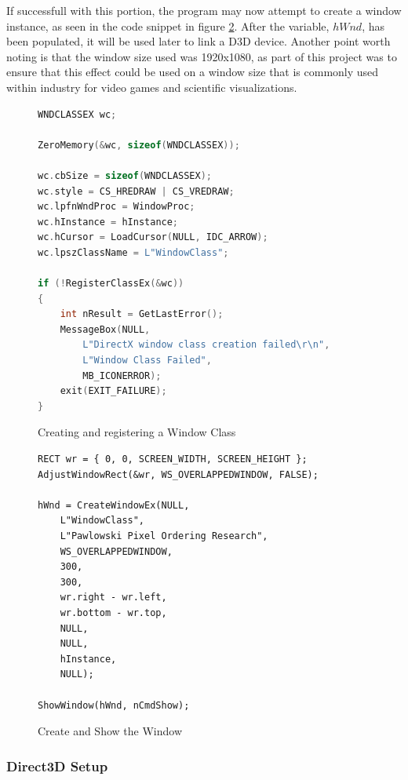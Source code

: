 \documentclass[a4paper, 12pt]{article}
\begin{document}
\noindent If successfull with this portion, the program may now attempt to
create a window instance, as seen in the code snippet in figure
\ref{code:CreateWindow}. After the variable, $hWnd$, has been populated, it
will be used later to link a D3D device. Another point worth noting is that
the window size used was 1920x1080, as part of this project was to ensure that
this effect could be used on a window size that is commonly used within
industry for video games and scientific visualizations.

\begin{figure}[h!]
\begin{lstlisting}[language=C++]
WNDCLASSEX wc;

ZeroMemory(&wc, sizeof(WNDCLASSEX));

wc.cbSize = sizeof(WNDCLASSEX);
wc.style = CS_HREDRAW | CS_VREDRAW;
wc.lpfnWndProc = WindowProc;
wc.hInstance = hInstance;
wc.hCursor = LoadCursor(NULL, IDC_ARROW);
wc.lpszClassName = L"WindowClass";

if (!RegisterClassEx(&wc))
{
	int nResult = GetLastError();
	MessageBox(NULL,
		L"DirectX window class creation failed\r\n",
		L"Window Class Failed",
		MB_ICONERROR);
	exit(EXIT_FAILURE);
}
\end{lstlisting}

\caption{Creating and registering a Window Class}
\label{code:winClass}
\end{figure}

\begin{figure}[h!]
\begin{lstlisting}[language=HLSL]
RECT wr = { 0, 0, SCREEN_WIDTH, SCREEN_HEIGHT };
AdjustWindowRect(&wr, WS_OVERLAPPEDWINDOW, FALSE);

hWnd = CreateWindowEx(NULL,
	L"WindowClass",
	L"Pawlowski Pixel Ordering Research",
	WS_OVERLAPPEDWINDOW,
	300,
	300,
	wr.right - wr.left,
	wr.bottom - wr.top,
	NULL,
	NULL,
	hInstance,
	NULL);

ShowWindow(hWnd, nCmdShow);
\end{lstlisting}
\caption{Create and Show the Window}
\label{code:CreateWindow}
\end{figure}

\subsubsection{Direct3D Setup}
\end{document}

